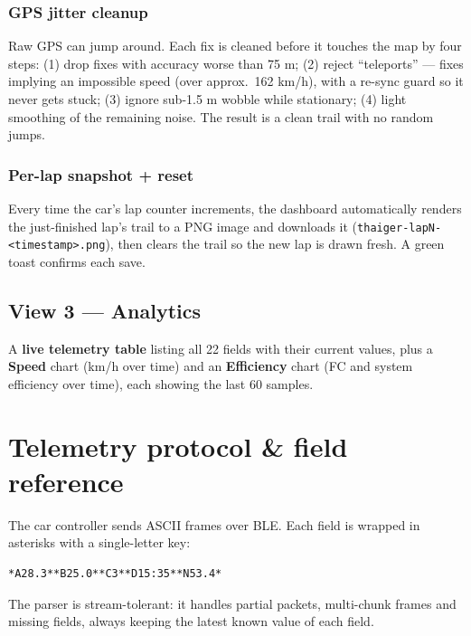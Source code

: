 \documentclass[11pt,a4paper,oneside]{report}
\newcommand{\code}[1]{\texttt{#1}}
\begin{document}
\subsubsection{GPS jitter cleanup}
Raw GPS can jump around. Each fix is cleaned before it touches the map by four
steps: (1) drop fixes with accuracy worse than 75 m; (2) reject ``teleports'' ---
fixes implying an impossible speed (over approx.\ 162 km/h), with a re-sync guard
so it never gets stuck; (3) ignore sub-1.5 m wobble while stationary; (4) light
smoothing of the remaining noise. The result is a clean trail with no random
jumps.

\subsubsection{Per-lap snapshot + reset}
Every time the car's lap counter increments, the dashboard automatically renders
the just-finished lap's trail to a PNG image and downloads it
(\code{thaiger-lapN-<timestamp>.png}), then clears the trail so the new lap is
drawn fresh. A green toast confirms each save.

\subsection{View 3 --- Analytics}
A \textbf{live telemetry table} listing all 22 fields with their current values,
plus a \textbf{Speed} chart (km/h over time) and an \textbf{Efficiency} chart (FC
and system efficiency over time), each showing the last 60 samples.

\section{Telemetry protocol \& field reference}
The car controller sends ASCII frames over BLE. Each field is wrapped in asterisks
with a single-letter key:

\begin{lstlisting}
*A28.3**B25.0**C3**D15:35**N53.4*
\end{lstlisting}
The parser is stream-tolerant: it handles partial packets, multi-chunk frames and
missing fields, always keeping the latest known value of each field.
\end{document}
